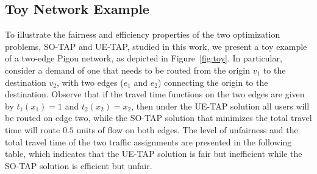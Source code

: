 \documentclass{article}
\begin{document}





\subsection{Toy Network Example} \label{sec:toy-network}

To illustrate the fairness and efficiency properties of the two optimization problems, SO-TAP and UE-TAP, studied in this work, we present a toy example of a two-edge Pigou network, as depicted in Figure~\ref{fig:toy}. In particular, consider a demand of one that needs to be routed from the origin $v_1$ to the destination $v_2$, with two edges ($e_1$ and $e_2$) connecting the origin to the destination. Observe that if the travel time functions on the two edges are given by $t_1(x_1) = 1$ and $t_2(x_2) = x_2$, then under the UE-TAP solution all users will be routed on edge two, while the SO-TAP solution that minimizes the total travel time will route $0.5$ units of flow on both edges. The level of unfairness and the total travel time of the two traffic assignments are presented in the following table, which indicates that the UE-TAP solution is fair but inefficient while the SO-TAP solution is efficient but unfair.

\end{document}
